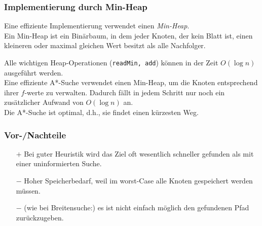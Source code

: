 \subsubsection{Implementierung durch Min-Heap}
Eine effiziente Implementierung verwendet einen \emph{Min-Heap}.\\
Ein Min-Heap ist ein Binärbaum, in dem jeder Knoten, der kein Blatt ist, einen kleineren oder maximal gleichen Wert besitzt als alle Nachfolger.
\begin{center}
\end{center}
Alle wichtigen Heap-Operationen (\lstinline`readMin, add`) können in der Zeit $O(\log n)$ ausgeführt werden.\\
Eine effiziente A*-Suche verwendet einen Min-Heap, um die Knoten entsprechend ihrer $f$-werte zu verwalten. Dadurch fällt in jedem Schritt nur noch ein zusätzlicher Aufwand von $O(\log n)$ an.\bigskip\\
Die A*-Suche ist optimal, d.h., sie findet einen kürzesten Weg.

\subsubsection{Vor-/Nachteile}
\begin{itemize}
\item[$+$] Bei guter Heuristik wird das Ziel oft wesentlich schneller gefunden als mit einer uninformierten Suche.
\item[$-$] Hoher Speicherbedarf, weil im worst-Case alle Knoten gespeichert werden müssen.
\item[$-$] (wie bei Breitensuche:) es ist nicht einfach möglich den gefundenen Pfad zurückzugeben. 
\end{itemize}

